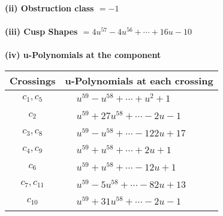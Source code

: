 \documentclass[1p]{elsarticle_modified}
\theoremstyle{definition}
\begin{document}
\flushleft \textbf{(ii) Obstruction class $= -1$}\\~\\
\flushleft \textbf{(iii) Cusp Shapes $= 4 u^{57}-4 u^{56}+\cdots+16 u-10$}\\~\\
\newpage\renewcommand{\arraystretch}{1}
\flushleft \textbf{(iv) u-Polynomials at the component}\newline \\
\begin{tabular}{m{50pt}|m{274pt}}
Crossings & \hspace{64pt}u-Polynomials at each crossing \\
\hline $$\begin{aligned}c_{1},c_{5}\end{aligned}$$&$\begin{aligned}
&u^{59}- u^{58}+\cdots+u^2+1
\end{aligned}$\\
\hline $$\begin{aligned}c_{2}\end{aligned}$$&$\begin{aligned}
&u^{59}+27 u^{58}+\cdots-2 u-1
\end{aligned}$\\
\hline $$\begin{aligned}c_{3},c_{8}\end{aligned}$$&$\begin{aligned}
&u^{59}- u^{58}+\cdots-122 u+17
\end{aligned}$\\
\hline $$\begin{aligned}c_{4},c_{9}\end{aligned}$$&$\begin{aligned}
&u^{59}+u^{58}+\cdots+2 u+1
\end{aligned}$\\
\hline $$\begin{aligned}c_{6}\end{aligned}$$&$\begin{aligned}
&u^{59}+u^{58}+\cdots-12 u+1
\end{aligned}$\\
\hline $$\begin{aligned}c_{7},c_{11}\end{aligned}$$&$\begin{aligned}
&u^{59}-5 u^{58}+\cdots-82 u+13
\end{aligned}$\\
\hline $$\begin{aligned}c_{10}\end{aligned}$$&$\begin{aligned}
&u^{59}+31 u^{58}+\cdots-2 u-1
\end{aligned}$\\
\hline
\end{tabular}\\~\\
\end{document}
